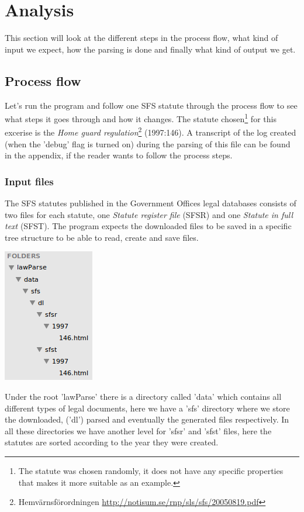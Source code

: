 \chapter{Analysis}

This section will look at the different steps in the process flow, what kind of input we expect, how the parsing is done and finally what kind of output we get. 

\section{Process flow}

Let's run the program and follow one SFS statute through the process flow to see what steps it goes through and how it changes. The statute chosen\footnote{The statute was chosen randomly, it does not have any specific properties that makes it more suitable as an example.} for this excerise is the \textit{Home guard regulation}\footnote{Hemvärnsförordningen \url{http://notisum.se/rnp/sls/sfs/20050819.pdf}} (1997:146). A transcript of the log created (when the 'debug' flag is turned on) during the parsing of this file can be found in the appendix, if the reader wants to follow the process steps.    

\subsection{Input files} 

The SFS statutes published in the Government Offices legal databases consists of two files for each statute, one \textit{Statute register file} (SFSR) and one \textit{Statute in full text} (SFST). The program expects the downloaded files to be saved in a specific tree structure to be able to read, create and save files.\\  

\begin{center}
\includegraphics[scale=1]{../imgs/structure.png}
\end{center}
Under the root 'lawParse' there is a directory called 'data' which contains all different types of legal documents, here we have a 'sfs' directory where we store the downloaded, ('dl') parsed and eventually the generated files respectively. In all these directories we have another level for 'sfsr' and 'sfst' files, here the statutes are sorted according to the year they were created.        

